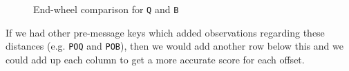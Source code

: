 \begin{figure}[H]
  \begin{center}
  \end{center}
  \caption{End-wheel comparison for \texttt{Q} and \texttt{B}}
\end{figure}

\noindent If we had other pre-message keys which added observations
regarding these distances (e.g. \texttt{POQ} and \texttt{POB}),
then we would add another row below this and we could add up each
column to get a more accurate score for each offset.

